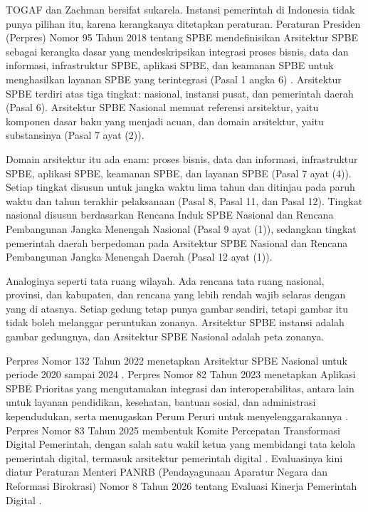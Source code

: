 TOGAF dan Zachman bersifat sukarela. Instansi pemerintah di Indonesia tidak
punya pilihan itu, karena kerangkanya ditetapkan peraturan. Peraturan
Presiden (Perpres) Nomor 95 Tahun 2018 tentang SPBE mendefinisikan Arsitektur
SPBE sebagai kerangka dasar yang mendeskripsikan integrasi proses bisnis,
data dan informasi, infrastruktur SPBE, aplikasi SPBE, dan keamanan SPBE
untuk menghasilkan layanan SPBE yang terintegrasi (Pasal 1 angka 6)
\cite{perpres95-2018}. Arsitektur SPBE terdiri atas tiga tingkat: nasional,
instansi pusat, dan pemerintah daerah (Pasal 6). Arsitektur SPBE Nasional
memuat referensi arsitektur, yaitu komponen dasar baku yang menjadi acuan,
dan domain arsitektur, yaitu substansinya (Pasal 7 ayat (2)).

Domain arsitektur itu ada enam: proses bisnis, data dan informasi,
infrastruktur SPBE, aplikasi SPBE, keamanan SPBE, dan layanan SPBE (Pasal 7
ayat (4)). Setiap tingkat disusun untuk jangka waktu lima tahun dan ditinjau
pada paruh waktu dan tahun terakhir pelaksanaan (Pasal 8, Pasal 11, dan
Pasal 12). Tingkat nasional disusun berdasarkan Rencana Induk SPBE Nasional
dan Rencana Pembangunan Jangka Menengah Nasional (Pasal 9 ayat (1)), sedangkan
tingkat pemerintah daerah berpedoman pada Arsitektur SPBE Nasional dan
Rencana Pembangunan Jangka Menengah Daerah (Pasal 12 ayat (1)).

Analoginya seperti tata ruang wilayah. Ada rencana tata ruang nasional,
provinsi, dan kabupaten, dan rencana yang lebih rendah wajib selaras dengan
yang di atasnya. Setiap gedung tetap punya gambar sendiri, tetapi gambar itu
tidak boleh melanggar peruntukan zonanya. Arsitektur SPBE instansi adalah
gambar gedungnya, dan Arsitektur SPBE Nasional adalah peta zonanya.

Perpres Nomor 132 Tahun 2022 menetapkan Arsitektur SPBE Nasional untuk
periode 2020 sampai 2024 \cite{perpres132-2022}. Perpres Nomor 82 Tahun 2023
menetapkan Aplikasi SPBE Prioritas yang mengutamakan integrasi dan
interoperabilitas, antara lain untuk layanan pendidikan, kesehatan, bantuan
sosial, dan administrasi kependudukan, serta menugaskan Perum Peruri untuk
menyelenggarakannya \cite{perpres82-2023}. Perpres Nomor 83 Tahun 2025
membentuk Komite Percepatan Transformasi Digital Pemerintah, dengan salah
satu wakil ketua yang membidangi tata kelola pemerintah digital, termasuk
arsitektur pemerintah digital \cite{perpres83-2025}. Evaluasinya kini diatur
Peraturan Menteri PANRB (Pendayagunaan Aparatur Negara dan Reformasi
Birokrasi) Nomor 8 Tahun 2026 tentang Evaluasi Kinerja Pemerintah Digital
\cite{permenpanrb8-2026}.

